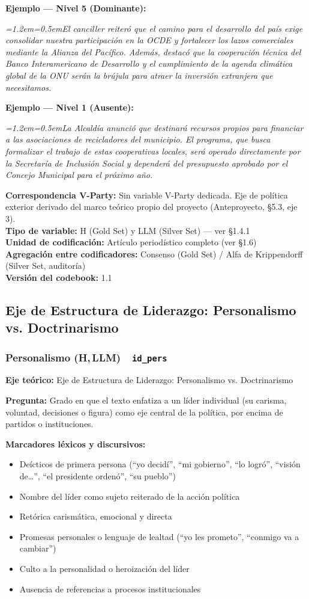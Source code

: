 \documentclass[11pt,letterpaper]{article}
\newcommand{\metaficha}[1]{%
  \par\smallskip\noindent\footnotesize\color{gris}%
  \textbf{Correspondencia V-Party:} #1\\
  \textbf{Tipo de variable:} H (Gold Set) y LLM (Silver Set) — ver §1.4.1\\
  \textbf{Unidad de codificación:} Artículo periodístico completo (ver §1.6)\\
  \textbf{Agregación entre codificadores:} Consenso (Gold Set) / Alfa de Krippendorff (Silver Set, auditoría)\\
  \textbf{Versión del codebook:} 1.1\par\normalsize\color{black}\medskip}
\newcommand{\ejemplo}[2]{%
  \par\smallskip\noindent\textbf{Ejemplo — #1:}\par\nopagebreak
  \begingroup\itshape\small\leftskip=1.2em\rightskip=0.5em\noindent #2\par\endgroup\smallskip}
\newcommand{\dimtitulo}[2]{\subsubsection*{#1 \normalfont\small\color{gris}(H,\,LLM)\ \ \texttt{#2}}%
  \addcontentsline{toc}{subsubsection}{#1}}
\begin{document}
\ejemplo{Nivel 5 (Dominante)}{El canciller reiteró que el camino para el desarrollo del país exige consolidar
nuestra participación en la OCDE y fortalecer los lazos comerciales mediante la Alianza del Pacífico. Además,
destacó que la cooperación técnica del Banco Interamericano de Desarrollo y el cumplimiento de la agenda
climática global de la ONU serán la brújula para atraer la inversión extranjera que necesitamos.}

\ejemplo{Nivel 1 (Ausente)}{La Alcaldía anunció que destinará recursos propios para financiar a las
asociaciones de recicladores del municipio. El programa, que busca formalizar el trabajo de estas
cooperativas locales, será operado directamente por la Secretaría de Inclusión Social y dependerá del
presupuesto aprobado por el Concejo Municipal para el próximo año.}

\metaficha{Sin variable V-Party dedicada. Eje de política exterior derivado del marco teórico propio del
proyecto (Anteproyecto, §5.3, eje 3).}

\newpage
\subsection{Eje de Estructura de Liderazgo: Personalismo vs. Doctrinarismo}

\dimtitulo{Personalismo}{id\_pers}
\textbf{Eje teórico:} Eje de Estructura de Liderazgo: Personalismo vs. Doctrinarismo

\textbf{Pregunta:} Grado en que el texto enfatiza a un líder individual (su carisma, voluntad, decisiones o
figura) como eje central de la política, por encima de partidos o instituciones.

\textbf{Marcadores léxicos y discursivos:}
\begin{itemize}
\item Deícticos de primera persona (“yo decidí”, “mi gobierno”, “lo logró”, “visión de…”, “el presidente
ordenó”, “su pueblo”)
\item Nombre del líder como sujeto reiterado de la acción política
\item Retórica carismática, emocional y directa
\item Promesas personales o lenguaje de lealtad (“yo les prometo”, “conmigo va a cambiar”)
\item Culto a la personalidad o heroización del líder
\item Ausencia de referencias a procesos institucionales
\end{itemize}
\end{document}
